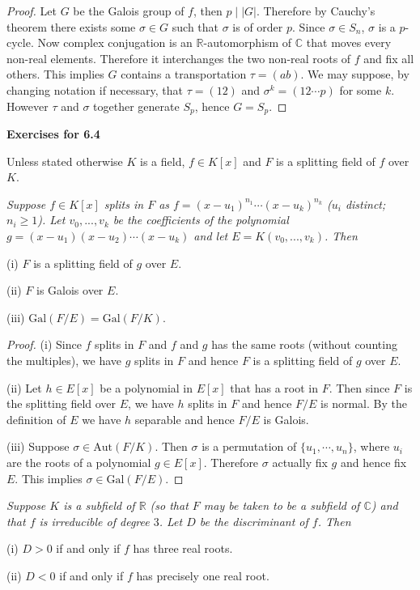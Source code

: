 \begin{proof}
Let $G$ be the Galois group of $f$, then $p\mid |G|$. Therefore by Cauchy's theorem there exists some $\sigma\in G$ such that $\sigma$ is of order $p$. Since $\sigma\in S_n$, $\sigma$ is a $p$-cycle. Now complex conjugation is an $\mathbb{R}$-automorphism of $\mathbb{C}$ that moves every non-real elements. Therefore it interchanges the two non-real roots of $f$ and fix all others. This implies $G$ contains a transportation $\tau=(ab)$. We may suppose, by changing notation if necessary, that $\tau=(12)$ and $\sigma^k=(12\cdots p)$ for some $k$. However $\tau$ and $\sigma$ together generate $S_p$, hence $G=S_p$.
\end{proof}
\begin{center}
\begin{large}
    \textbf{Exercises for 6.4}
\end{large}
\end{center}
Unless stated otherwise $K$ is a field, $f\in K[x]$ and $F$ is a splitting field of $f$ over $K$.
\begin{problem}\em
Suppose $f\in K[x]$ splits in $F$ as $f=(x-u_1)^{n_1}\cdots (x-u_k)^{n_k}$ ($u_i$ distinct; $n_i\geq 1$). Let $v_0, ..., v_k$ be the coefficients of the polynomial $g=(x-u_1)(x-u_2)\cdots (x-u_k)$ and let $E=K(v_0, ..., v_k)$. Then \par
(i) $F$ is a splitting field of $g$ over $E$.\par
(ii) $F$ is Galois over $E$.\par
(iii) $\mathrm{Gal}(F/E)=\mathrm{Gal}(F/K)$.
\end{problem}
\begin{proof}
(i) Since $f$ splits in $F$ and $f$ and $g$ has the same roots (without counting the multiples), we have $g$ splits in $F$ and hence $F$ is a splitting field of $g$ over $E$.\par
(ii) Let $h\in E[x]$ be a polynomial in $E[x]$ that has a root in $F$. Then since $F$ is the splitting field over $E$, we have $h$ splits in $F$ and hence  $F/E$ is normal. By the definition of $E$ we have $h$ separable and hence $F/E$ is Galois.\par
(iii) Suppose $\sigma\in\mathrm{Aut}(F/K)$. Then $\sigma$ is a permutation of $\{u_1,\cdots,u_n\}$, where $u_i$ are the roots of a polynomial $g\in E[x]$. Therefore $\sigma$ actually fix $g$ and hence fix $E$. This implies $\sigma\in\mathrm{Gal}(F/E)$.
\end{proof}
\begin{problem}\em
Suppose $K$ is a subfield of $\mathbb{R}$ (so that $F$ may be taken to be a subfield of $\mathbb{C}$) and that $f$ is irreducible of degree $3$. Let $D$ be the discriminant of $f$. Then \par
(i) $D>0$ if and only if $f$ has three real roots.\par
(ii) $D<0$ if and only if $f$ has precisely one real root.
\end{problem}
